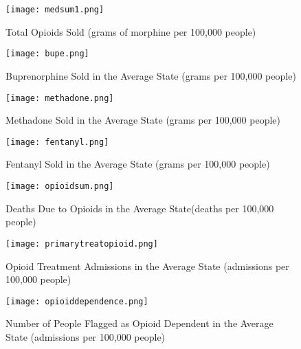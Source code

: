 \documentclass[11pt]{article}
\begin{document}
\clearpage

\begin{figure}
\begin{center}
  \texttt{[image: medsum1.png]}
  \caption{Total Opioids Sold (grams of morphine per 100,000 people)}
  \label{Total Opioids Sold}
  \end{center}
\end{figure}

\begin{figure} 
\begin{center}
  \texttt{[image: bupe.png]}
  \caption{Buprenorphine Sold in the Average State (grams per 100,000 people)}
  \label{Buprenorphine}
   \end{center}
\end{figure}

\begin{figure} 
\begin{center}
  \texttt{[image: methadone.png]}
  \caption{Methadone Sold in the Average State (grams per 100,000 people)}
  \label{Methadone}
   \end{center}
\end{figure}

\begin{figure} 
\begin{center}
  \texttt{[image: fentanyl.png]}
  \caption{Fentanyl Sold in the Average State (grams per 100,000 people)}
  \label{Fenanyl}
   \end{center}
\end{figure}

\begin{figure} 
\begin{center}
  \texttt{[image: opioidsum.png]}
  \caption{Deaths Due to Opioids in the Average State(deaths per 100,000 people)}
  \label{Deaths}
   \end{center}
\end{figure}

\begin{figure}
\begin{center} 
  \texttt{[image: primarytreatopioid.png]}
  \label{primary}
  \caption{Opioid Treatment Admissions in the Average State (admissions per 100,000 people)}
   \end{center}
\end{figure}

\begin{figure} 
\begin{center}
  \texttt{[image: opioiddependence.png]}
  \caption{Number of People Flagged as Opioid Dependent in the Average State (admissions per 100,000 people)}
   \label{dependence}
    \end{center}
\end{figure}
\end{document}
